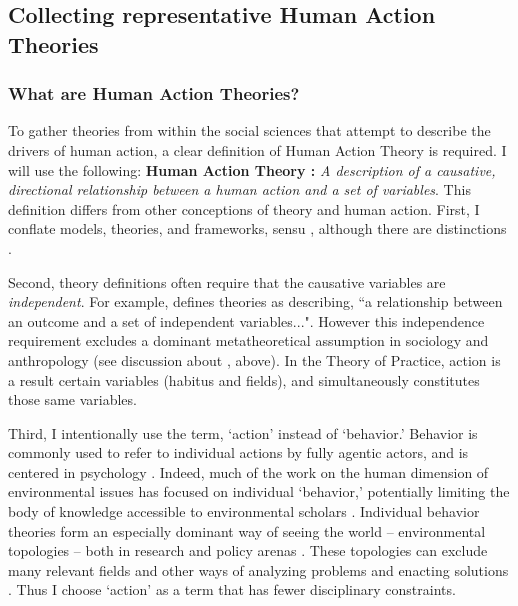 \documentclass[12 pt]{article}
\begin{document}
\subsection{Collecting representative Human Action Theories}
	\subsubsection{What are Human Action Theories?} 
	To gather theories from within the social sciences that attempt to describe the drivers of human action, a clear definition of Human Action Theory is required. I will use the following: \textbf{Human Action Theory :}  \textit{A description of a causative, directional relationship between a human action and a set of variables}. This definition differs from other conceptions of theory and human action. First, I conflate models, theories, and frameworks, sensu \textcite{Littlejohn1983}, although there are distinctions \parencite{Hawes1975,Cox2016}. 
	
	Second, theory definitions often require that the causative variables are \textit{independent}. For example,  \textcite[][p. 47]{Cox2016} defines theories as describing, ``a relationship between an outcome and a set of independent variables...". However this independence requirement excludes a dominant metatheoretical assumption in sociology and anthropology (see discussion about \textcite{Davis2015}, above). In the Theory of Practice, action is a result certain variables (habitus and fields), and simultaneously constitutes those same variables.
	
	Third, I intentionally use the term, `action' instead of `behavior.' Behavior is commonly used to refer to individual actions by fully agentic actors, and is centered in psychology  \parencite[e.g.,][]{Stern2000}. Indeed, much of the work on the human dimension of environmental issues has focused on individual `behavior,'  potentially limiting the body of knowledge accessible to environmental scholars \parencite{Shove2010}. Individual behavior theories form an especially dominant way of seeing the world -- environmental topologies -- both in research and policy arenas \parencite{Shove2010}. These topologies can exclude many relevant fields and other ways of analyzing problems and enacting solutions \parencite{Brosius1999}. Thus I choose `action' as a term that has fewer disciplinary constraints. 
\end{document}
